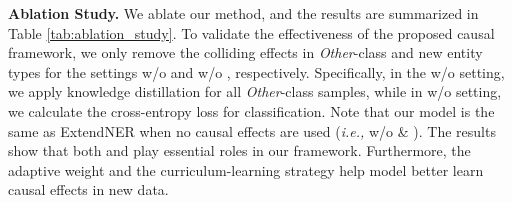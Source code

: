 \documentclass[11pt]{article}
\begin{document}
\begin{table}[htbp]
  \tiny
  \centering
  \caption{The ablation study of our method on three datasets in the setting FG-1-PG-1. \textit{AW}: adaptive weight; \textit{CuL}: curriculum learning strategy; \textit{Mi-F1}: micro-F1; \textit{Ma-F1}: macro-F1.}
  \label{tab:ablation_study}\end{table}

\noindent\textbf{Ablation Study.}\quad
We ablate our method, and the results are summarized in Table \ref{tab:ablation_study}.
To validate the effectiveness of the proposed causal framework, we only remove the colliding effects in \textit{Other}-class and new entity types for the settings w/o  and w/o , respectively.
Specifically, in the w/o  setting, we apply knowledge distillation for all \textit{Other}-class samples, while in w/o  setting, we calculate the cross-entropy loss for classification.
Note that our model is the same as ExtendNER when no causal effects are used (\textit{i.e.,} w/o  \& ).
The results show that both  and  play essential roles in our framework.
Furthermore, the adaptive weight and the curriculum-learning strategy help model better learn causal effects in new data.
\end{document}
